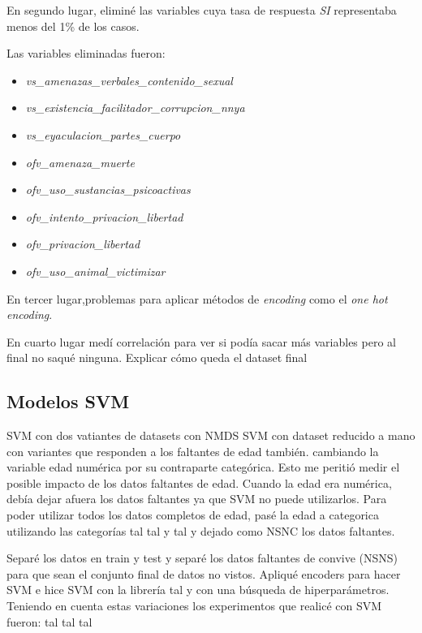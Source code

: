 \documentclass[10 pt]{article}
\begin{document}
En segundo lugar, eliminé las variables cuya tasa de respuesta \textit{SI} representaba menos del 1\% de los casos. 

Las variables eliminadas fueron:

\begin{itemize}
    \item \textit{vs\_amenazas\_verbales\_contenido\_sexual} 
    \item \textit{vs\_existencia\_facilitador\_corrupcion\_nnya}
    \item \textit{vs\_eyaculacion\_partes\_cuerpo}
    \item \textit{ofv\_amenaza\_muerte}
    \item \textit{ofv\_uso\_sustancias\_psicoactivas} 
    \item \textit{ofv\_intento\_privacion\_libertad}
    \item \textit{ofv\_privacion\_libertad}
    \item \textit{ofv\_uso\_animal\_victimizar} 
\end{itemize}


En tercer lugar,problemas para aplicar métodos de \textit{encoding} como el \textit{one hot encoding}. %

En cuarto lugar  medí correlación para ver si podía sacar más variables pero al final no saqué ninguna. Explicar cómo queda el dataset final 



\subsection{Modelos SVM}

SVM con dos vatiantes de datasets con NMDS
SVM con dataset reducido a mano con variantes que responden a los faltantes de edad también. cambiando la variable edad numérica por su contraparte categórica. Esto me peritió medir el posible impacto de los datos faltantes de edad. Cuando la edad era numérica, debía dejar afuera los datos faltantes ya que SVM no puede utilizarlos. Para poder utilizar todos los datos completos de edad, pasé la edad a categorica  utilizando las categorías tal tal y tal y dejado como NSNC los datos faltantes.

Separé los datos en train y test y separé los datos faltantes de convive (NSNS) para que sean el conjunto final de datos no vistos.  
Apliqué encoders para hacer SVM e hice SVM con la librería tal y con una búsqueda de hiperparámetros.  Teniendo en cuenta estas variaciones los experimentos que realicé con SVM fueron: 
tal tal tal
\end{document}
